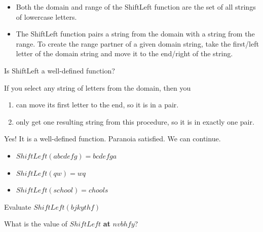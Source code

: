 \documentclass{ximera}
\begin{document}
\begin{definition} 
\begin{itemize}
\item Both the domain and range of the ShiftLeft function are the set of all strings of lowercase letters. 
\item The ShiftLeft function pairs a string from the domain with a string from the range. To create the range partner of a given domain string, take the first/left letter of the domain string and move it to the end/right of the string.
\end{itemize}
\end{definition}


Is ShiftLeft a well-defined function?

If you select any string of letters from the domain, then you
\begin{enumerate}
\item can move its first letter to the end, so it is in a pair.
\item only get one resulting string from this procedure, so it is in exactly one pair.
\end{enumerate}
  
Yes!  It is a well-defined function.  Paranoia satisfied. We can continue.


\begin{example}
\begin{itemize}
\item $ShiftLeft(abcdefg) = bcdefga$
\item $ShiftLeft(qw) = wq$
\item $ShiftLeft(school) = chools$
\end{itemize}
\end{example}


\begin{question}
Evaluate $ShiftLeft(bjkythf)$
\begin{multipleChoice}
\end{multipleChoice}
\end{question}


\begin{question}
What is the value of $ShiftLeft$ \textbf{at} $nvbhfy$?
\begin{multipleChoice}
\end{multipleChoice}
\end{question}
\end{document}
